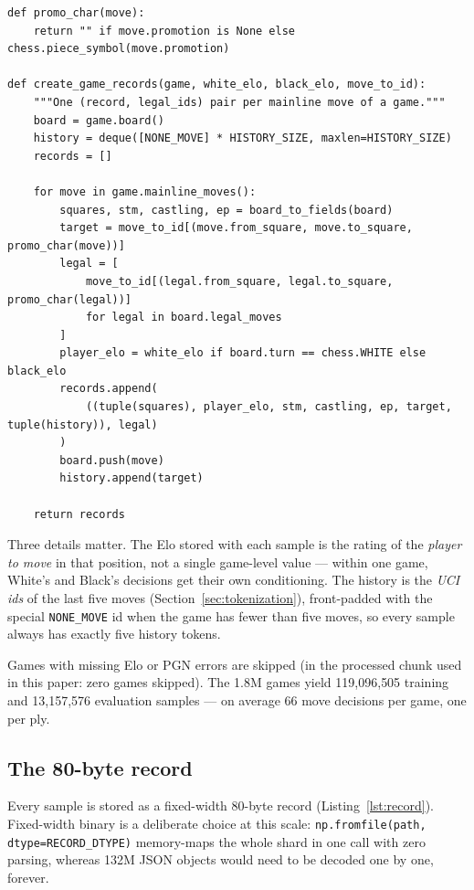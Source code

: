 \documentclass[10pt,a4paper]{article}
\newcommand{\code}[1]{\texttt{#1}}
\begin{document}
\begin{lstlisting}[style=code, caption={One (record, legal-id-list) pair per
mainline move of a game (\code{process\_lichess\_db.py}). The
\code{deque} with \code{maxlen=5} is a sliding window: initialized to five
pad tokens, it forgets the oldest move every time a new one is appended.},
label={lst:records}, float=htbp]
def promo_char(move):
    return "" if move.promotion is None else chess.piece_symbol(move.promotion)

def create_game_records(game, white_elo, black_elo, move_to_id):
    """One (record, legal_ids) pair per mainline move of a game."""
    board = game.board()
    history = deque([NONE_MOVE] * HISTORY_SIZE, maxlen=HISTORY_SIZE)
    records = []

    for move in game.mainline_moves():
        squares, stm, castling, ep = board_to_fields(board)
        target = move_to_id[(move.from_square, move.to_square, promo_char(move))]
        legal = [
            move_to_id[(legal.from_square, legal.to_square, promo_char(legal))]
            for legal in board.legal_moves
        ]
        player_elo = white_elo if board.turn == chess.WHITE else black_elo
        records.append(
            ((tuple(squares), player_elo, stm, castling, ep, target, tuple(history)), legal)
        )
        board.push(move)
        history.append(target)

    return records
\end{lstlisting}

Three details matter. The Elo stored with each sample is the rating of
the \emph{player to move} in that position, not a single game-level
value --- within one game, White's and Black's decisions get their own
conditioning. The history is the \emph{UCI ids} of the last five moves
(Section~\ref{sec:tokenization}), front-padded with the special
\code{NONE\_MOVE} id when the game has fewer than five moves, so every
sample always has exactly five history tokens.

Games with missing Elo or PGN errors are skipped (in the processed chunk
used in this paper: zero games skipped). The 1.8M games yield
119{,}096{,}505 training and 13{,}157{,}576 evaluation samples --- on
average 66 move decisions per game, one per ply.

\subsection{The 80-byte record}

Every sample is stored as a fixed-width 80-byte record
(Listing~\ref{lst:record}). Fixed-width binary is a deliberate choice at
this scale: \code{np.fromfile(path, dtype=RECORD\_DTYPE)} memory-maps the
whole shard in one call with zero parsing, whereas 132M JSON objects would
need to be decoded one by one, forever.
\end{document}
